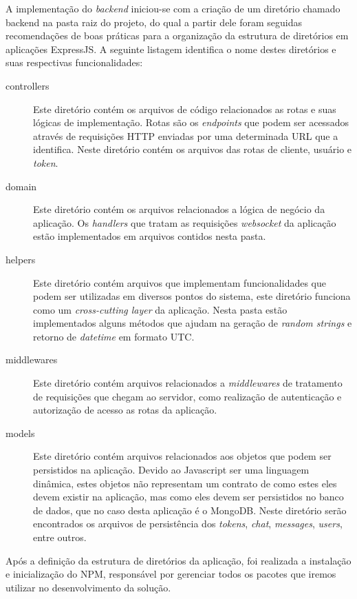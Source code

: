 A implementação do \textit{backend} iniciou-se com a criação de um diretório chamado backend na pasta raiz do projeto, do qual a partir dele foram seguidas recomendações de boas práticas \cite{express-app-structure} para a organização da estrutura de diretórios em aplicações ExpressJS. A seguinte listagem identifica o nome destes diretórios e suas respectivas funcionalidades:

\begin{description}
	\item[controllers] Este diretório contém os arquivos de código relacionados as rotas e suas lógicas de implementação. Rotas são os \textit{endpoints} que podem ser acessados através de requisições HTTP enviadas por uma determinada URL que a identifica. Neste diretório contém os arquivos das rotas de cliente, usuário e \textit{token}.
	
	\item[domain] Este diretório contém os arquivos relacionados a lógica de negócio da aplicação. Os \textit{handlers} que tratam as requisições \textit{websocket} da aplicação estão implementados em arquivos contidos nesta pasta.
	
	\item[helpers] Este diretório contém arquivos que implementam funcionalidades que podem ser utilizadas em diversos pontos do sistema, este diretório funciona como um \textit{cross-cutting layer} da aplicação. Nesta pasta estão implementados alguns métodos que ajudam na geração de \textit{random strings} e retorno de \textit{datetime} em formato UTC.
	
	\item[middlewares] Este diretório contém arquivos relacionados a \textit{middlewares} de tratamento de requisições que chegam ao servidor, como realização de autenticação e autorização de acesso as rotas da aplicação.
	
	\item[models] Este diretório contém arquivos relacionados aos objetos que podem ser persistidos na aplicação. Devido ao Javascript ser uma linguagem dinâmica, estes objetos não representam um contrato de como estes eles devem existir na aplicação, mas como eles devem ser persistidos no banco de dados, que no caso desta aplicação é o MongoDB. Neste diretório serão encontrados os arquivos de persistência dos \textit{tokens}, \textit{chat}, \textit{messages}, \textit{users}, entre outros.
\end{description}

Após a definição da estrutura de diretórios da aplicação, foi realizada a instalação e inicialização do NPM, responsável por gerenciar todos os pacotes que iremos utilizar no desenvolvimento da solução.

